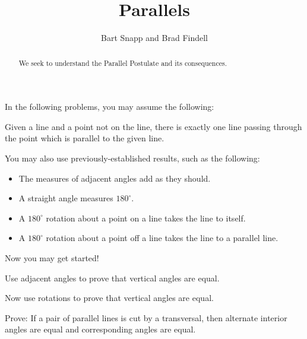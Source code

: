 \documentclass[nooutcomes]{ximera}
\title{Parallels}
\author{Bart Snapp and Brad Findell}
\begin{document}
\begin{abstract}
  We seek to understand the Parallel Postulate and its consequences.
\end{abstract}
\maketitle

\begin{teachingnote}
\end{teachingnote}

In the following problems, you may assume the following: 

\begin{postulate}
Given a line and a point not on the line, there is exactly one line passing through the point which is parallel to the given line.
\end{postulate}

You may also use previously-established results, such as the following: 
\begin{itemize}
\itemsep -3pt
\item The measures of adjacent angles add as they should.
\item A straight angle measures $180^\circ$.  
\item A $180^\circ$ rotation about a point on a line takes the line to itself.  
\item A $180^\circ$ rotation about a point off a line takes the line to a parallel line.  
\end{itemize}

Now you may get started! 

\begin{problem}
Use adjacent angles to prove that vertical angles are equal.    
\end{problem}

\begin{problem}
Now use rotations to prove that vertical angles are equal.
\end{problem}


\begin{problem}
Prove:  If a pair of parallel lines is cut by a transversal, then alternate interior angles are equal and corresponding angles are equal.
\end{problem}
\end{document}
